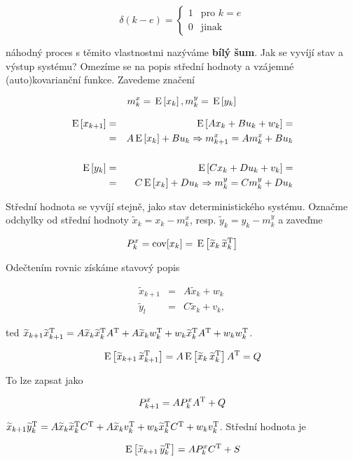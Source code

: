 \[ \delta(k-e)=\begin{cases} 1 & \text{pro } k = e\\ 0 & \text{jinak} \end{cases} \]

náhodný proces s těmito vlastnostmi nazýváme \textbf{bílý šum}. Jak se vyvíjí stav a výstup systému? Omezíme se na popis střední hodnoty a vzájemné (auto)kovarianční funkce. Zavedeme značení

\[ m_k^x=\,\mathrm{E}\left[x_k\right], m_k^y=\,\mathrm{E}\left[y_k\right] \]

\begin{eqnarray*}
\,\mathrm{E}\left[x_{k+1}\right] & = & \,\mathrm{E}\left[Ax_k+Bu_k+w_k\right] =\\
& = & A\,\mathrm{E}\left[x_k\right]+Bu_k \Rightarrow m_{k+1}^x = Am_k^x + Bu_k\\
&&\\
\,\mathrm{E}\left[y_k\right] & = & \,\mathrm{E}\left[Cx_k+Du_k+v_k\right] =\\
& = & C\,\mathrm{E}\left[x_k\right]+Du_k \Rightarrow m_{k}^y = Cm_k^y + Du_k
\end{eqnarray*}

Střední hodnota se vyvíjí stejně, jako stav deterministického systému. Označme odchylky od střední hodnoty $\widetilde{x}_k = x_k-m_k^x$, resp. $\widetilde{y}_k=y_k-m_k^y$ a zaveďme

\[ P_k^x=\mathrm{cov}[x_k]=\,\mathrm{E}\left[\widetilde{x}_k\, \widetilde{x}_k^{\mathrm{T}}\right] \]

Odečtením rovnic získáme stavový popis

\begin{eqnarray*}
\widetilde{x}_{k+1} & = & A\widetilde{x}_k + w_k\\
\widetilde{y}_l & = & C\widetilde{x}_k + v_k,
\end{eqnarray*}

ted $\widetilde{x}_{k+1}\widetilde{x}_{k+1}^{\mathrm{T}} = A\widetilde{x}_{k}\widetilde{x}_{k}^{\mathrm{T}} A^{\mathrm{T}} + A\widetilde{x}_{k}w_k^{\mathrm{T}} + w_k\widetilde{x}_{k}^{\mathrm{T}} A^{\mathrm{T}}+w_kw_k^{\mathrm{T}}$.

\[ \,\mathrm{E}\left[\widetilde{x}_{k+1}\, \widetilde{x}_{k+1}^{\mathrm{T}}\right] = A\,\mathrm{E}\left[\widetilde{x}_{k}\,\widetilde{x}_{k}^{\mathrm{T}}\right]A^{\mathrm{T}}=Q \]

To lze zapsat jako

\[ P_{k+1}^x = AP_k^x A^{\mathrm{T}}+Q \]

$\widetilde{x}_{k+1}\widetilde{y}_{k}^{\mathrm{T}} = A\widetilde{x}_{k}\widetilde{x}_{k}^{\mathrm{T}} C^{\mathrm{T}} + A\widetilde{x}_{k}v_k^{\mathrm{T}} + w_k\widetilde{x}_{k}^{\mathrm{T}} C^{\mathrm{T}}+w_k v_k^{\mathrm{T}}$. Střední hodnota je

\[ \,\mathrm{E}\left[\widetilde{x}_{k+1}\, \widetilde{y}_{k}^{\mathrm{T}}\right] = AP_k^x C^{\mathrm{T}} + S \]

